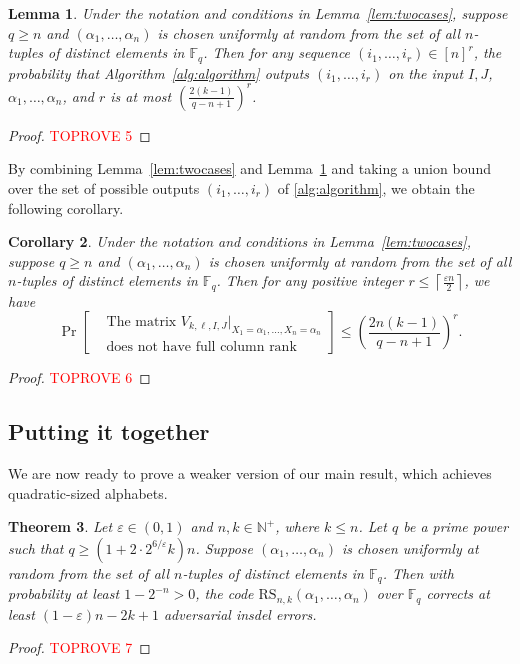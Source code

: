 \documentclass[11pt]{article}
\theoremstyle{plain}
\newtheorem{thm}{Theorem}
\newtheorem{lemma}[thm]{Lemma}
\newtheorem{cor}[thm]{Corollary}
\theoremstyle{definition}
\theoremstyle{remark}
\newcommand{\N}{\mathbb{N}}
\newcommand{\F}{\mathbb{F}}
\newcommand{\ceil}[1]{\left\lceil #1 \right\rceil}
\renewcommand{\epsilon}{\varepsilon}
\newcommand{\Fq}{\mathbb{F}_q}
\begin{document}
\begin{lemma}\label{CGLZ24}\label{lem:certprob}
Under the notation and conditions in Lemma~\ref{lem:twocases}, suppose $q\geq n$ and $(\alpha_1,\dots,\alpha_n)$ is chosen uniformly at random from the set of all $n$-tuples of distinct elements in $\F_q$. Then for any sequence $(i_1,\dots,i_r)\in [n]^r$, the probability that Algorithm~\ref{alg:algorithm} outputs $(i_1,\dots,i_r)$ on the input $I,J$, $\alpha_1,\dots,\alpha_n$, and $r$ is at most $\left(\frac{2(k-1)}{q-n+1}\right)^r$.
\end{lemma}
\begin{proof}\textcolor{red}{TOPROVE 5}\end{proof}
By combining Lemma~\ref{lem:twocases} and Lemma~\ref{CGLZ24}  and taking a union bound over the set of possible outputs  $(i_1,\dots,i_r)$ of \cref{alg:algorithm}, we obtain the following corollary.
\begin{cor}\label{cor:fullrankprob}
Under the notation and conditions in Lemma~\ref{lem:twocases}, suppose $q\geq n$ and $(\alpha_1,\dots,\alpha_n)$ is chosen uniformly at random from the set of all $n$-tuples of distinct elements in $\F_q$. 
Then for any positive integer $r\le\ceil{\frac{\varepsilon n}{2}}$, we have 
\[
\Pr\left[\begin{aligned}
    &\text{The matrix }V_{k,\ell,I,J}|_{X_1=\alpha_1,\dots,X_{n}=\alpha_{n}}\\
&\text{does not have full column rank}
\end{aligned}\right]\leq 
\left(\frac{2n(k-1)}{q-n+1}\right)^r.
\]
\end{cor}
\begin{proof}\textcolor{red}{TOPROVE 6}\end{proof}
\subsection{Putting it together}
We are now ready to prove a weaker version of our main result, which achieves quadratic-sized alphabets.
\begin{thm}\label{m1}
Let $\varepsilon\in (0,1)$ and $n,k\in\N^+$, where $k\leq n$.  
Let $q$ be a prime power such that $q\geq \left(1+2\cdot 2^{6/\epsilon}k\right)n$. 
Suppose $(\alpha_1,\dots,\alpha_n)$ is chosen uniformly at random from the set of all $n$-tuples of distinct elements in $\F_q$.
Then with probability at least $1-2^{-n}>0$, the code $\text{RS}_{n,k}(\alpha_1, \ldots, \alpha_n)$ over $\Fq$ corrects at least $(1-\epsilon)n-2k+1$ adversarial insdel errors.
\end{thm}
\begin{proof}\textcolor{red}{TOPROVE 7}\end{proof}
\end{document}
